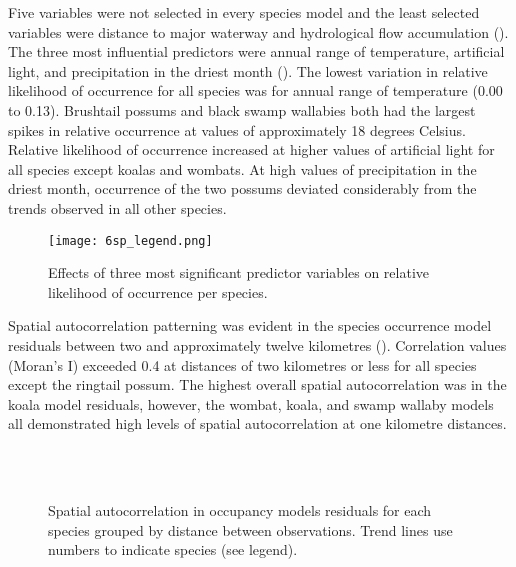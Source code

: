 Five variables were not selected in every species model and the least selected variables were distance to major waterway and hydrological flow accumulation (). The three most influential predictors were annual range of temperature, artificial light, and precipitation in the driest month (). The lowest variation in relative likelihood of occurrence for all species was for annual range of temperature (0.00 to 0.13). Brushtail possums and black swamp wallabies both had the largest spikes in relative occurrence at values of approximately 18 degrees Celsius. Relative likelihood of occurrence increased at higher values of artificial light for all species except koalas and wombats. At high values of precipitation in the driest month, occurrence of the two possums deviated considerably from the trends observed in all other species. 

\begin{figure*}[htp]
  \centering
  \texttt{[image: 6sp\_legend.png]}\\
  \caption[Most significant predictor variables on relative likelihood of occurrence for six mammal species]{Effects of three most significant predictor variables on relative likelihood of occurrence per species.}
  \label{6sp_term_occ}
\end{figure*}

Spatial autocorrelation patterning was evident in the species occurrence model residuals between two and approximately twelve kilometres (). Correlation values (Moran's I) exceeded 0.4 at distances of two kilometres or less for all species except the ringtail possum. The highest overall spatial autocorrelation was in the koala model residuals, however, the wombat, koala, and swamp wallaby models all demonstrated high levels of spatial autocorrelation at one kilometre distances.

\begin{figure*}[htp]
  \centering
  \\
  \\
  \caption[Spatial autocorrelation in occupancy models residuals for six mammal species]{Spatial autocorrelation in occupancy models residuals for each species grouped by distance between observations. Trend lines use numbers to indicate species (see legend).}
  \label{6sp_sac}
\end{figure*}

